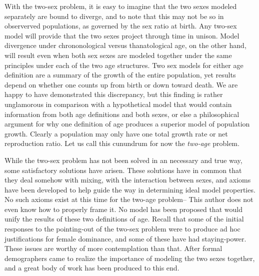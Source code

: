 With the two-sex problem, it is easy to imagine that the two sexes modeled
separately are bound to diverge, and to note that this may not be so in
observerved populations, as governed by the sex ratio at birth. Any two-sex
model will provide that the two sexes project through time in unison. Model
divergence under chrononological versus thanatological age, on the other hand,
will result even when both sex sexes are modeled together under the same principles under each
of the two age structures. Two sex models for either age definition are a
summary of the growth of the entire population, yet results depend on whether
one counts up from birth or down toward death. We are happy to have demonstrated
this discrepancy, but this finding is rather unglamorous in comparison with a
hypothetical model that would contain information from both age definitions and
both sexes, or else a philosophical argument for why one definition of age
produces a superior model of population growth. Clearly a population may only
have one total growth rate or net reproduction ratio. Let us call this cunundrum 
for now the \textit{two-age} problem.

While the two-sex problem has not been solved in an necessary and true way, some
satisfactory solutions have arisen. These solutions have in common that they
deal somehow with mixing, with the interaction between sexes, and axioms have
been developed to help guide the way in determining ideal model properties. No
such axioms exist at this time for the two-age problem-- This author does not
even know how to properly frame it. No model has been proposed
that would unify the results of these two definitions of age. Recall that some 
of the initial responses to the pointing-out of the two-sex problem
were to produce ad hoc justifications for female dominance, and some of these
have had staying-power. These issues are worthy of more contemplation than that.
After \citet{karmel1947relations} formal demographers came to realize the
importance of modeling the two sexes together, and a great body 
of work has been produced to this end. 

\FloatBarrier